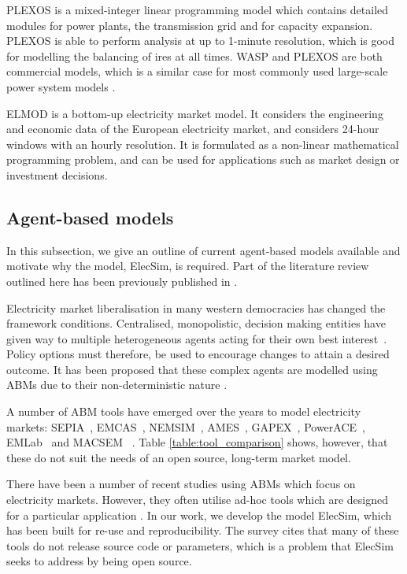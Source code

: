 PLEXOS is a mixed-integer linear programming model which contains detailed modules for power plants, the transmission grid and for capacity expansion. PLEXOS is able to perform analysis at up to 1-minute resolution, which is good for modelling the balancing of \acrshort{ires} at all times. WASP and PLEXOS are both commercial models, which is a similar case for most commonly used large-scale power system models \cite{Pfenninger2014}.

ELMOD is a bottom-up electricity market model. It considers the engineering and economic data of the European electricity market, and considers 24-hour windows with an hourly resolution. It is formulated as a non-linear mathematical programming problem, and can be used for applications such as market design or investment decisions.


\subsection*{Agent-based models}

In this subsection, we give an outline of current agent-based models available and motivate why the model, ElecSim, is required. Part of the literature review outlined here has been previously published in \cite{Kell}.

Electricity market liberalisation in many western democracies has changed the framework conditions. Centralised, monopolistic, decision making entities have given way to multiple heterogeneous agents acting for their own best interest~\cite{Most2010}. Policy options must therefore, be used to encourage changes to attain a desired outcome. It has been proposed that these complex agents are modelled using ABMs due to their non-deterministic nature \cite{Kell}. 

A number of ABM tools have emerged over the years to model electricity markets: SEPIA~\cite{Harp2000}, EMCAS~\cite{Conzelmann}, NEMSIM~\cite{Batten2006}, AMES~\cite{Sun2007}, GAPEX~\cite{Cincotti2013}, PowerACE~\cite{Rothengatter2007}, EMLab~\cite{Chappin2017} and MACSEM ~\cite{Praca2003}. Table \ref{table:tool_comparison} shows, however, that these do not suit the needs of an open source, long-term market model. 

There have been a number of recent studies using ABMs which focus on electricity markets. However, they often utilise ad-hoc tools which are designed for a particular application \cite{Saxena2019, hadar2019, Kunzel2018}. In our work, we develop the model ElecSim, which has been built for re-use and reproducibility. The survey \cite{Weidlich2008} cites that many of these tools do not release source code or parameters, which is a problem that ElecSim seeks to address by being open source.

